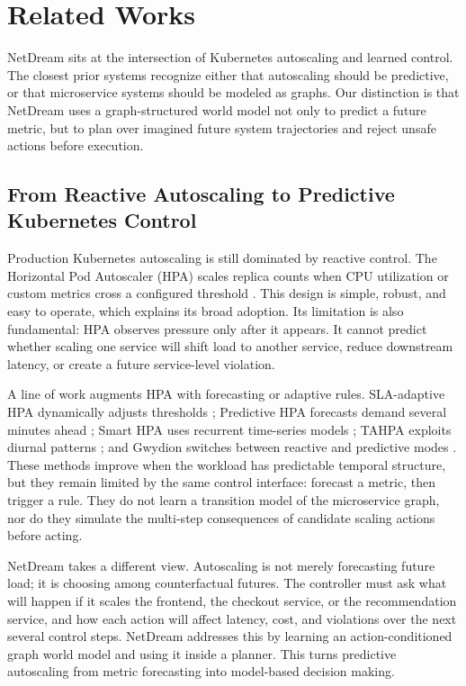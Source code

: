 \section{Related Works}
\label{sec:related}
NetDream sits at the intersection of Kubernetes autoscaling and learned
control.  The closest prior systems recognize either that autoscaling
should be predictive, or that microservice systems should be modeled as
graphs.  Our distinction is that NetDream uses a graph-structured world
model not only to predict a future metric, but to plan over imagined
future system trajectories and reject unsafe actions before execution.

\subsection{From Reactive Autoscaling to Predictive Kubernetes Control}
\label{sec:related-reactive-predictive}

Production Kubernetes autoscaling is still dominated by reactive control.
The Horizontal Pod Autoscaler (HPA) scales replica counts when CPU
utilization or custom metrics cross a configured threshold
\citep{rzadca2020autopilot,googlecloud2025hpa,aws2025hpa}.  This design
is simple, robust, and easy to operate, which explains its broad
adoption.  Its limitation is also fundamental: HPA observes pressure only
after it appears.  It cannot predict whether scaling one service will
shift load to another service, reduce downstream latency, or create a
future service-level violation.

A line of work augments HPA with forecasting or adaptive rules.
SLA-adaptive HPA dynamically adjusts thresholds
\citep{pozdniakova2024sla}; Predictive HPA forecasts demand several
minutes ahead \citep{mondal2023predictive}; Smart HPA uses recurrent
time-series models \citep{ahmad2024smarthpa}; TAHPA exploits diurnal
patterns \citep{phuc2022tahpa}; and Gwydion switches between reactive
and predictive modes \citep{santos2024gwydion}.  These methods improve
when the workload has predictable temporal structure, but they remain
limited by the same control interface: forecast a metric, then trigger a
rule.  They do not learn a transition model of the microservice graph,
nor do they simulate the multi-step consequences of candidate scaling
actions before acting.

NetDream takes a different view.  Autoscaling is not merely forecasting
future load; it is choosing among counterfactual futures.  The controller
must ask what will happen if it scales the frontend, the checkout
service, or the recommendation service, and how each action will affect
latency, cost, and violations over the next several control steps.
NetDream addresses this by learning an action-conditioned graph world
model and using it inside a planner.  This turns predictive autoscaling
from metric forecasting into model-based decision making.

